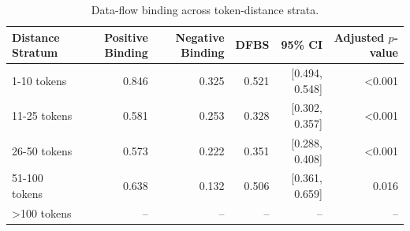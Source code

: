 \begin{table}[t]
\centering
\caption{Data-flow binding across token-distance strata.}
\label{tab:strata}
\begin{tabular}{lrrrrr}
\toprule
Distance Stratum & Positive Binding & Negative Binding & DFBS & 95\% CI & Adjusted $p$-value \\
\midrule
1-10 tokens & 0.846 & 0.325 & 0.521 & [0.494, 0.548] & \textless{}0.001 \\
11-25 tokens & 0.581 & 0.253 & 0.328 & [0.302, 0.357] & \textless{}0.001 \\
26-50 tokens & 0.573 & 0.222 & 0.351 & [0.288, 0.408] & \textless{}0.001 \\
51-100 tokens & 0.638 & 0.132 & 0.506 & [0.361, 0.659] & 0.016 \\
\textgreater{}100 tokens & -- & -- & -- & -- & -- \\
\bottomrule
\end{tabular}
\end{table}
